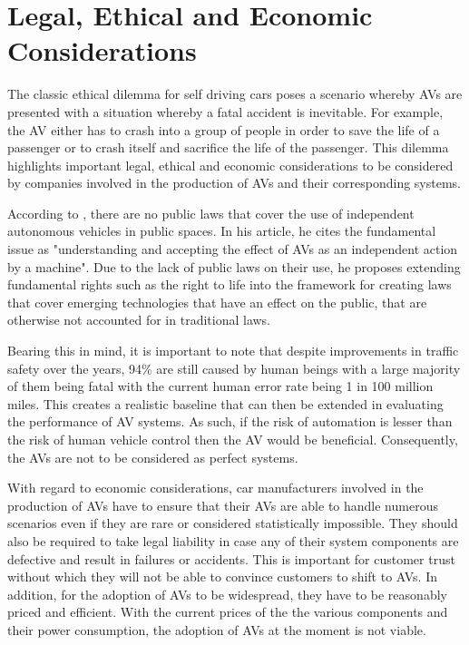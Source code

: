 \section{Legal, Ethical and Economic Considerations}

The classic ethical dilemma for self driving cars poses a scenario whereby AVs are presented with a situation whereby a fatal accident is inevitable. For example, the AV either has to crash into a group of people in order to save the life of a passenger or to crash itself and sacrifice the life of the passenger. This dilemma highlights important legal, ethical and economic considerations to be considered by companies involved in the production of AVs and their corresponding systems. 


According to \cite{gasser2016fundamental}, there are no public laws that cover the  use of independent autonomous vehicles in public spaces. In his article, he cites the fundamental issue as "understanding and accepting the effect of AVs as an independent action by a machine". Due to the lack of public laws on their use, he proposes extending fundamental rights such as the right to life into the framework for creating laws that cover emerging technologies that have an effect on the public, that are otherwise not accounted for in traditional laws. 

Bearing this in mind, it is important to note that despite improvements in traffic safety over the years, 94\% are still caused by human beings with a large majority of them being fatal with the current human error rate being 1 in 100 million miles. This creates a realistic baseline that can then be extended in evaluating the performance of AV systems. As such, if the risk of automation is lesser than the risk of human vehicle control then the AV would be beneficial. Consequently, the AVs are not to be considered as perfect systems.

With regard to economic considerations, car manufacturers involved in the production of AVs have to ensure that their AVs are able to handle numerous scenarios even if they are rare or considered statistically impossible. They should also be required to take legal liability in case any of their system components are defective and result in failures or accidents. This is important for customer trust without which they will not be able to convince customers to shift to AVs. In addition, for the adoption of AVs to be widespread, they have to be reasonably priced and efficient. With the current prices of the the various components and their power consumption, the adoption of AVs at the moment is not viable. 



